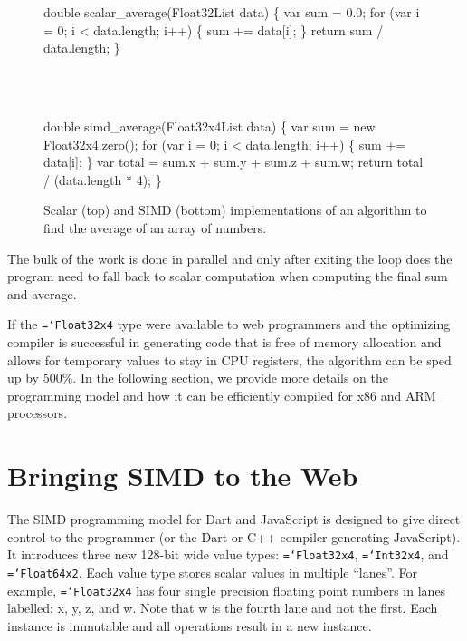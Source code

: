 \documentclass{sigplanconf}
\newcommand{\ttt}[1]{{\texttt{\hyphenchar\font=`\-\relax #1}}}%
\begin{document}
\begin{figure}
\begin{small}
\begin{program}[style=tt, number=true]
do\tab{}uble scalar\_average(Float32List data) \{
  var sum = 0.0;
  fo\tab{}r (var i = 0; i < data.length; i++) \{
    sum += data[i];\untab{}
  \}
  return sum / data.length;\untab{}
\}
\end{program}
\end{small}
\ \ \\ \ \ \\
\begin{small}
\begin{program}[style=tt, number=true]
do\tab{}uble simd\_average(Float32x4List data) \{
  var sum = new Float32x4.zero();
  fo\tab{}r (var i = 0; i < data.length; i++) \{
    sum += data[i];\untab{}
  \}
  var total = sum.x + sum.y + sum.z + sum.w;
  return total / (data.length * 4);\untab{}
\}
\end{program}
\end{small}
\caption{Scalar (top) and SIMD (bottom) implementations of an algorithm to find
the average of an array of numbers.}
\label{fig:average}
\end{figure}

The bulk of the work is done in parallel and only after exiting the loop
does the program need to fall back to scalar computation when computing the
final sum and average.

If the \ttt{Float32x4} type were available to web programmers and the optimizing
compiler is successful in generating code that is free of memory allocation and
allows for temporary values to stay in CPU registers, the algorithm can be sped
up by 500\%. In the following section, we provide more details on the
programming model and how it can be efficiently compiled for x86 and ARM
processors.

\section{Bringing SIMD to the Web}

The SIMD programming model for Dart and JavaScript is designed to give direct
control to the programmer (or the Dart or C++ compiler generating JavaScript).
It introduces three new 128-bit wide value types: \ttt{Float32x4},
\ttt{Int32x4}, and \ttt{Float64x2}. Each value type stores scalar values in
multiple ``lanes''. For example, \ttt{Float32x4} has four single precision
floating point numbers in lanes labelled: x, y, z, and w. Note that w is the
fourth lane and not the first. Each instance is immutable and all operations
result in a new instance.
\end{document}
